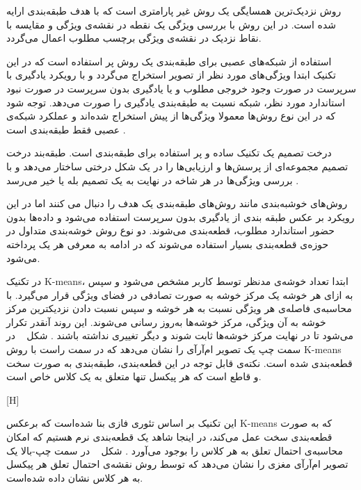 روش نزدیک‌ترین همسایگی یک روش غیر پارامتری است که با هدف طبقه‌بندی ارایه شده است. در این روش با بررسی ویژگی یک نقطه در نقشه‌ی ویژگی و مقایسه با نقاط نزدیک در نقشه‌ی ویژگی برچسب مطلوب اعمال می‌گردد. 

استفاده از شبکه‌های عصبی برای طبقه‌بندی یک روش پر استفاده است که در این تکنیک ابتدا ویژگی‌های مورد نظر از تصویر استخراج می‌گردد و با رویکرد یادگیری با سرپرست در صورت وجود خروجی مطلوب و یا یادگیری بدون سرپرست در صورت نبود استاندارد مورد نظر، شبکه نسبت به طبقه‌بندی یادگیری را صورت می‌دهد. توجه شود که در این نوع روش‌ها معمولا ویژگی‌ها از پیش استخراج شده‌اند و عملکرد شبکه‌ی عصبی فقط طبقه‌بندی است .

درخت تصمیم یک تکنیک ساده و پر استفاده برای طبقه‌بندی است. طبقه‌بند درخت تصمیم مجموعه‌ای از پرسش‌ها و ارزیابی‌ها را در یک شکل درختی ساختار می‌دهد و با بررسی ویژگی‌ها در هر شاخه در نهایت به یک تصمیم بله یا خیر می‌رسد .

روش‌های خوشبه‌بندی مانند روش‌های طبقه‌بندی یک هدف را دنبال می کنند اما در این رویکرد بر عکس طبقه بندی از یادگیری بدون سرپرست استفاده می‌شود و داده‌ها بدون حضور استاندارد مطلوب، قطعه‌بندی می‌شوند. دو نوع روش خوشه‌بندی متداول در حوزه‌ی قطعه‌بندی بسیار استفاده می‌شوند که در ادامه به معرفی هر یک پرداخته می‌شود.

در تکنیک K-means، ابتدا تعداد خوشه‌ی مدنظر توسط کاربر مشخص می‌شود و سپس به ازای هر خوشه یک مرکز خوشه به صورت تصادفی در فضای ویژگی قرار می‌گیرد. با محاسبه‌ی فاصله‌ی هر ویژگی نسبت به هر خوشه و سپس نسبت دادن نزدیکترین مرکز خوشه به آن ویژگی، مرکز خوشه‌ها به‌روز رسانی می‌شوند. این روند آنقدر تکرار می‌شود تا در نهایت مرکز خوشه‌ها ثابت شوند و دیگر تغییری نداشته باشند . شکل ~ در سمت چپ یک تصویر ام‌آرآی را نشان می‌دهد که در سمت راست با روش K-means قطعه‌بندی شده است. نکته‌ی قابل توجه در این قطعه‌بندی، طبقه‌بندی به صورت سخت و قاطع است که هر پیکسل تنها متعلق به یک کلاس خاص است.

[H]

این تکنیک بر اساس تئوری فازی بنا شده‌است که برعکس K-means که به صورت قطعه‌بندی سخت عمل می‌کند، در اینجا شاهد یک قطعه‌بندی نرم هستیم که امکان محاسبه‌ی احتمال تعلق به هر کلاس را بوجود می‌آورد . شکل ~ در سمت چپ-بالا یک تصویر ام‌آرآی مغزی را نشان می‌دهد که توسط روش  نقشه‌ی احتمال تعلق هر پیکسل به هر کلاس نشان داده شده‌است.


